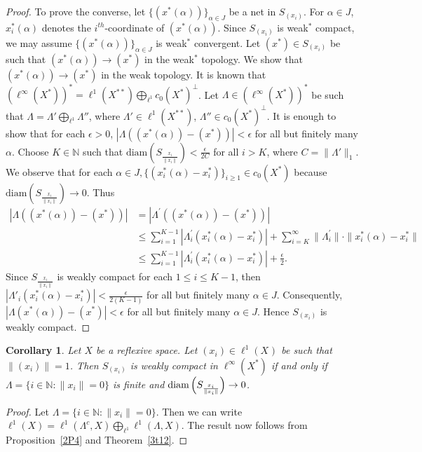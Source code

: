 \documentclass[12pt]{amsart}
\newtheorem{corollary}[theorem]{Corollary}
\theoremstyle{definition}
\numberwithin{equation}{section}
\begin{document}
\begin{proof}
To prove the converse, let $\{ (x^*(\alpha)) \}_{\alpha\in J}$ be a net in $S_{(x_i)}$. For $\alpha\in J$, $x_{i}^*(\alpha)$ denotes the $i^{th}$-coordinate of $(x^*(\alpha))$. Since $S_{(x_i)}$ is weak$^*$ compact, we may assume $\{ (x^*(\alpha) )\}_{\alpha\in J}$ is weak$^*$ convergent. Let $(x^*)\in S_{(x_i)}$ be such that $(x^*_{}(\alpha))\rightarrow (x^*_{})$ in the weak$^*$ topology. We show that $(x^*_{}(\alpha))\rightarrow (x^*_{})$ in the weak topology. It is known that $(\ell^\infty(X^*))^* = \ell^{1}(X^{**})\bigoplus_{\ell^{1}}c_{0}(X^*)^{\perp}$. Let $\Lambda\in(\ell^\infty(X^*))^*$ be such that $\Lambda = \Lambda' \bigoplus_{\ell^1} \Lambda''$, where $\Lambda'\in \ell^{1}(X^{**})$, $\Lambda''\in c_{0}(X^*)^{\perp}$. It is enough to show that for each $ \epsilon > 0 $,  $ |\Lambda((x^*(\alpha)) - (x^*))| < \epsilon $ for all but finitely many $ \alpha $. Choose $ K \in \mathbb{N} $ such that $\text{diam}\left(S_{\frac{x_i}{\|x_{i}\|}}\right) < \frac{\epsilon}{2C}$ for all $ i > K $, where $ C = \| \Lambda' \|_{1} $. We observe that for each $\alpha\in J, \{(x_{i}^*(\alpha)-x_{i}^*)\}_{i\geq1}\in c_{0}(X^*)$ because $\text{diam}\left(S_{\frac{x_i}{\|x_{i}\|}}\right)\to0$. Thus
\begin{align*}
    |\Lambda((x^*(\alpha)) - (x^*))|&=|\Lambda^{'}((x^*(\alpha)) - (x^*))|\\
&\leq \sum_{i=1}^{K-1} |\Lambda^{'}_i  ( x_i^*(\alpha) - x_i^*)|+ \sum_{i=K}^{\infty} \| \Lambda^{'}_i \| \cdot \| x_i^*(\alpha) - x_i^* \|\\
&\leq \sum_{i=1}^{K-1} | \Lambda^{'}_i ( x_i^*(\alpha) - x_i^*)|+\frac{\epsilon}{2}.
\end{align*}
 Since $S_{\frac{x_i}{\|x_{i}\|}} $ is weakly compact for each $1\leq i\leq K-1$, then $|\Lambda'_{i}(x_{i}^*(\alpha) -x_{i}^*)|<\frac{\epsilon}{2(K-1)}$ for all but finitely many $\alpha\in J$. Consequently, $|\Lambda(x^*(\alpha)) - (x^*)| < \epsilon$ for all but finitely many $\alpha\in J$. Hence $S_{(x_i)}$ is weakly compact.
\end{proof}
\begin{corollary}
   Let $X$ be a reflexive space. Let $(x_i) \in \ell^{1}(X_{}) $ be such that $ \| (x_i) \| = 1 $. Then $ S_{(x_i)}$ is weakly compact in $ \ell^\infty(X^*) $ if and only if  $\Lambda=\{i\in\mathbb{N:}\|x_{i}\|=0\}$ is finite and $ \textup{diam}\left(S_{\frac{x_i}{\|x_i\|}}\right) \to 0 $.
\end{corollary}
\begin{proof}
    Let $\Lambda=\{i\in\mathbb{N:}\|x_{i}\|=0\}$. Then we can write $\ell^1(X)=\ell^1(\Lambda^c,X)\bigoplus_{\ell^1}\ell^1(\Lambda,X)$. The result now follows from Proposition~\ref{2P4} and Theorem~\ref{3t12}.
\end{proof}
\end{document}
